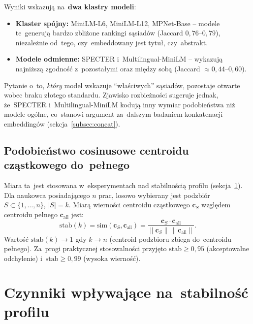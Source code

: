 Wyniki wskazują na~\textbf{dwa klastry modeli}:
\begin{itemize}
    \item \textbf{Klaster spójny:} MiniLM-L6, MiniLM-L12, MPNet-Base
    -- modele te~generują bardzo zbliżone rankingi sąsiadów
    (Jaccard $0{,}76$--$0{,}79$), niezależnie od~tego,
    czy~embeddowany jest tytuł, czy~abstrakt.
    \item \textbf{Modele odmienne:} SPECTER i~Multilingual-MiniLM
    -- wykazują najniższą zgodność z~pozostałymi
    oraz między sobą (Jaccard $\approx 0{,}44$--$0{,}60$).
\end{itemize}

Pytanie o~to, \emph{który} model wskazuje ``właściwych'' sąsiadów,
pozostaje otwarte wobec braku złotego standardu.
Zjawisko rozbieżności sugeruje jednak, że~SPECTER i~Multilingual-MiniLM
kodują inny wymiar podobieństwa niż modele ogólne,
co~stanowi argument za~dalszym badaniem konkatenacji embeddingów
(sekcja~\ref{subsec:concat}).

\subsection{Podobieństwo cosinusowe centroidu cząstkowego do~pełnego}
\label{subsec:cosine_stability}

Miara ta~jest stosowana w~eksperymentach nad stabilnością profilu
(sekcja~\ref{sec:stability}).
Dla naukowca posiadającego $n$ prac, losowo wybierany jest podzbiór
$S \subset \{1,\ldots,n\}$, $|S|=k$.
Miarą wierności centroidu cząstkowego $\mathbf{c}_S$
względem centroidu pełnego $\mathbf{c}_{\mathrm{all}}$ jest:
\begin{equation}
    \mathrm{stab}(k) =
    \mathrm{sim}(\mathbf{c}_S, \mathbf{c}_{\mathrm{all}})
    = \frac{\mathbf{c}_S \cdot \mathbf{c}_{\mathrm{all}}}
           {\|\mathbf{c}_S\|\,\|\mathbf{c}_{\mathrm{all}}\|}.
\end{equation}
Wartość $\mathrm{stab}(k) \to 1$ gdy $k \to n$
(centroid podzbioru zbiega do~centroidu pełnego).
Za~progi praktycznej stosowalności przyjęto
$\mathrm{stab} \geq 0{,}95$ (akceptowalne odchylenie)
i~$\mathrm{stab} \geq 0{,}99$ (wysoka wierność).

\section{Czynniki wpływające na~stabilność profilu}
\label{sec:stability}


